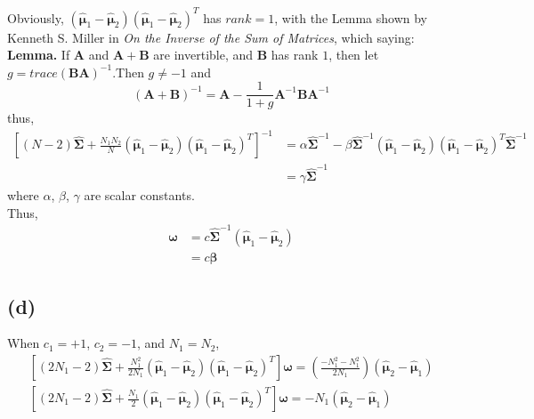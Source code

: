 \documentclass[11pt]{article}
\begin{document}
Obviously, $\left(\hat{\pmb{\mu}}_1-\hat{\pmb{\mu}}_2\right)\left(\hat{\pmb{\mu}}_1-\hat{\pmb{\mu}}_2\right)^T$ has $rank = 1$, with the Lemma shown by Kenneth S. Miller in \textit{On the Inverse of the Sum of Matrices}, which saying:
\textbf{Lemma.} If $\pmb{A}$ and $\pmb{A}+\pmb{B}$ are invertible, and $\pmb{B}$ has rank $1$, then let $g=trace(\pmb{BA})^{-1}$.Then $g\ne-1$ and
$$(\pmb{A}+\pmb{B})^{-1}=\pmb{A}-\frac{1}{1+g}\pmb{A}^{-1}\pmb{B}\pmb{A}^{-1}$$
thus,
\begin{equation}
\begin{split}
\left[(N-2)\hat{\pmb{\Sigma}} +\frac{N_1N_2}{N}\left(\hat{\pmb{\mu}}_1-\hat{\pmb{\mu}}_2\right)\left(\hat{\pmb{\mu}}_1-\hat{\pmb{\mu}}_2\right)^T\right]^{-1}&=\alpha\hat{\pmb{\Sigma}}^{-1}-\beta\hat{\pmb{\Sigma}}^{-1}\left(\hat{\pmb{\mu}}_1-\hat{\pmb{\mu}}_2\right)\left(\hat{\pmb{\mu}}_1-\hat{\pmb{\mu}}_2\right)^T\hat{\pmb{\Sigma}}^{-1}\\
&=\gamma\hat{\pmb{\Sigma}}^{-1}
\end{split}
\end{equation}
where $\alpha$, $\beta$, $\gamma$ are scalar constants.\\
Thus, 
\begin{equation}
\begin{split}
\pmb{\omega}&=c\hat{\pmb{\Sigma}}^{-1}\left(\hat{\pmb{\mu}}_1-\hat{\pmb{\mu}}_2\right)\\
&=c\pmb{\beta}
\end{split}
\end{equation}
\subsection*{(d)}
When $c_1=+1$, $c_2=-1$, and $N_1=N_2$,
\begin{equation}
\begin{split}
\left[(2N_1-2)\hat{\pmb{\Sigma}} +\frac{N_1^2}{2N_1}\left(\hat{\pmb{\mu}}_1-\hat{\pmb{\mu}}_2\right)\left(\hat{\pmb{\mu}}_1-\hat{\pmb{\mu}}_2\right)^T\right]\pmb{\omega}=\left(\frac{-N_1^2-N_1^2}{2N_1}\right)\left(\hat{\pmb{\mu}}_2-\hat{\pmb{\mu}}_1\right)\\
\left[(2N_1-2)\hat{\pmb{\Sigma}} +\frac{N_1}{2}\left(\hat{\pmb{\mu}}_1-\hat{\pmb{\mu}}_2\right)\left(\hat{\pmb{\mu}}_1-\hat{\pmb{\mu}}_2\right)^T\right]\pmb{\omega}=-N_1\left(\hat{\pmb{\mu}}_2-\hat{\pmb{\mu}}_1\right)\\
\end{split}
\end{equation}
\end{document}
